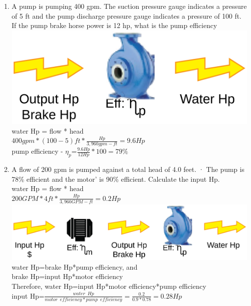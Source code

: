 \documentclass{article}
\begin{document}
\begin{enumerate}
\item A pump is pumping 400 gpm.  The suction pressure gauge indicates a pressure of 5 ft and the pump discharge pressure gauge indicates a pressure of 100 ft.  If the pump brake horse power is 12 hp, what is the pump efficiency\\
\vspace{0.4cm}
\includegraphics[scale=0.08]{PumpProblemPumpHp}\\
water Hp = flow * head\\
$400gpm*(100-5)ft*\frac{Hp}{3,960 gpm-ft}=\boxed{9.6Hp}$\\
\vspace{0.4cm}
pump efficiency - $\eta_p$=$\frac{9.6Hp}{12Hp}*100=\boxed{79\%}$
\vspace{0.4cm}

\item A flow of 200 gpm  is pumped against a total head of 4.0 feet. · The pump is 78\% efficient and the motor' is 90\% efficient. Calculate the input Hp.\\
\vspace{0.4cm}
water Hp = flow * head\\
$200GPM*4ft*\frac{Hp}{3,960 GPM-ft}=0.2Hp$\\
\vspace{0.4cm}\includegraphics[scale=0.08]{PumpProblem}\\
water Hp=brake Hp*pump efficiency, and\\
brake Hp=input Hp*motor efficiency\\
Therefore, water Hp=input Hp*motor efficiency*pump efficiency\\
\vspace{0.4cm}
input Hp=$\frac{water \enspace Hp}{motor \enspace efficiency*pump \enspace efficiency}=\frac{0.2}{0.9*0.78}=\boxed{0.28Hp}$


\end{enumerate}
\end{document}
